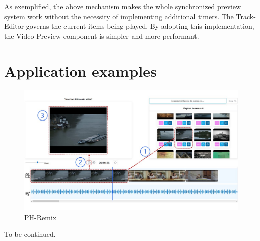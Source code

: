 As exemplified, the above mechanism makes the whole synchronized preview system work without the necessity of implementing additional timers. The Track-Editor governs the current items being played. By adopting this implementation, the Video-Preview component is simpler and more performant.

\section{Application examples}
\label{sec:appExamples}

\begin{figure}[H]
\centering
\includegraphics[width=1\textwidth]{images/PH-REmixannotatedUI.jpg}
\caption{PH-Remix}
\label{fig:phRmx}
\end{figure}

To be continued.